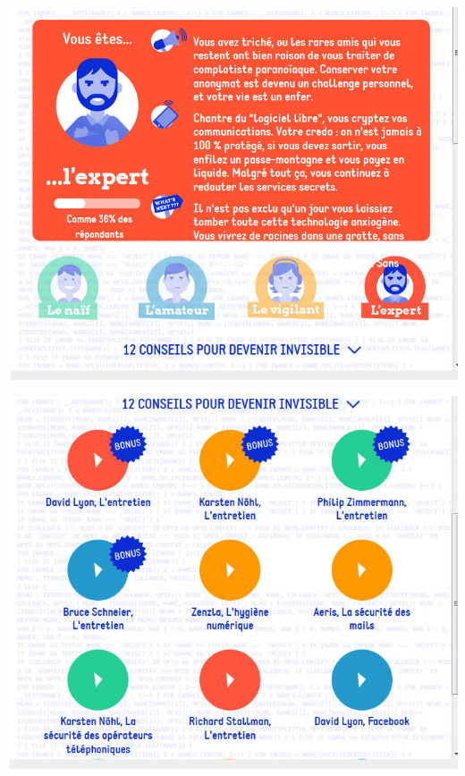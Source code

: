 \documentclass{beamer}
\begin{document}
\begin{frame}\includegraphics[scale=0.6] {./images/Quizz_HygieneNumerique_France4_42.jpg} \end{frame}
\begin{frame}\includegraphics[scale=0.6] {./images/Quizz_HygieneNumerique_France4_43.jpg} \end{frame}
\end{document}
